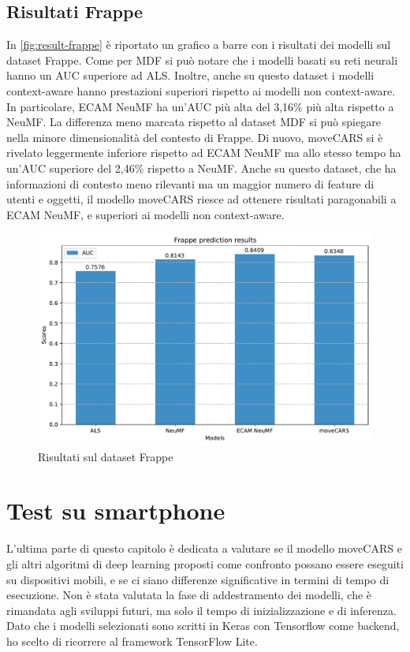 \documentclass[12pt,italian]{report}
\begin{document}
\subsection{Risultati Frappe}
In \autoref{fig:result-frappe} è riportato un grafico a barre con i risultati dei modelli sul dataset Frappe. Come per MDF si può notare che i modelli basati su reti neurali hanno un AUC superiore ad ALS. Inoltre, anche su questo dataset i modelli context-aware hanno prestazioni superiori rispetto ai modelli non context-aware. In particolare, ECAM NeuMF ha un'AUC più alta del 3,16\% più alta rispetto a NeuMF. La differenza meno marcata rispetto al dataset MDF si può spiegare nella minore dimensionalità del contesto di Frappe. Di nuovo, moveCARS si è rivelato leggermente inferiore rispetto ad ECAM NeuMF ma allo stesso tempo ha un'AUC superiore del 2,46\% rispetto a NeuMF. Anche su questo dataset, che ha informazioni di contesto meno rilevanti ma un maggior numero di feature di utenti e oggetti, il modello moveCARS riesce ad ottenere risultati paragonabili a ECAM NeuMF, e superiori ai modelli non context-aware.

\begin{figure}
  \centering
  \includegraphics[width=\linewidth]{immagini/frappe_test_results.pdf}
  \caption{Risultati sul dataset Frappe}
  \label{fig:result-frappe}
\end{figure}

\section{Test su smartphone} \label{sec:smartphone}
L'ultima parte di questo capitolo è dedicata a valutare se il modello moveCARS e gli altri algoritmi di deep learning proposti come confronto possano essere eseguiti su dispositivi mobili, e se ci siano differenze significative in termini di tempo di esecuzione. Non è stata valutata la fase di addestramento dei modelli, che è rimandata agli sviluppi futuri, ma solo il tempo di inizializzazione e di inferenza. Dato che i modelli selezionati sono scritti in Keras con Tensorflow come backend, ho scelto di ricorrere al framework TensorFlow Lite. 
\end{document}
